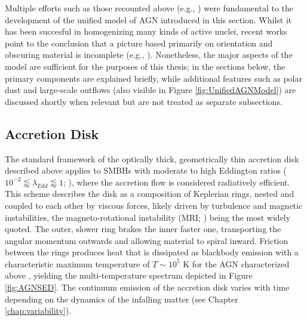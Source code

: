 Multiple efforts such as those recounted above (e.g., \cites{Antonucci1984SpecPolarimOtherGalax}{OrrBrowne1982AGNBeaming}) were fundamental to the development of the  unified model of AGN introduced in this section. Whilst it has been succesful in homogenizing many kinds of active nuclei, recent works point to the conclusion that a picture based primarily on orientation and obscuring material is incomplete (e.g., \cite{Bianchi2012UMAGNcons}). Nonetheless, the major aspects of the model are sufficient for the purposes of this thesis; in the sections below, the primary components are explained briefly, while additional features such as polar dust and large-scale outflows (also visible in Figure \ref{fig:UnifiedAGNModel}) are discussed shortly when relevant but are not treated as separate subsections.

\subsection{Accretion Disk}
\label{ssec:AccretionDisk}

The standard framework of the optically thick, geometrically thin accretion disk \parencite{ShakuraSunyaev1973BHAppearance} described above applies to SMBHs with moderate to high Eddington ratios ($10^{-2} \lessapprox \lambda_{Edd} \lessapprox 1$; \cite{Ricci2026unificationmodelsactivegalactic}), where the accretion flow is considered radiatively efficient. This scheme describes the disk as a composition of Keplerian rings, nested and coupled to each other by viscous forces, likely driven by turbulence and magnetic instabilities, the magneto-rotational instability (MRI; \cite{Balbus1998TurbulenceAccretionD}) being the most widely quoted. The outer, slower ring brakes the inner faster one, transporting the angular momentum outwards and allowing material to spiral inward. Friction between the rings produces heat that is dissipated as blackbody emission with a characteristic maximum temperature of $T \sim 10^5$ K for the  AGN characterized above \parencite{Netzer2013PhyEvolofAGNBook}, yielding the multi-temperature spectrum depicted in Figure \ref{fig:AGNSED}. The continuum emission of the accretion disk varies with time depending on the dynamics of the infalling matter (see Chapter \ref{chap:variability}).


